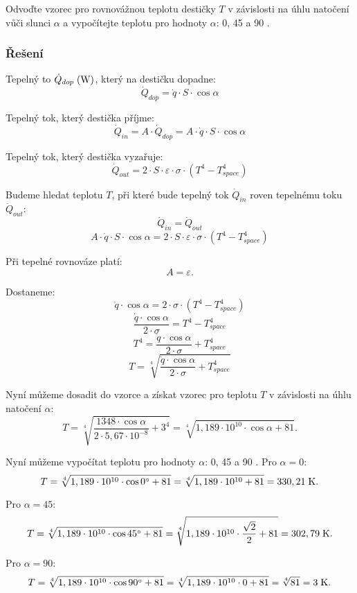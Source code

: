 \documentclass{article}
\begin{document}
Odvoďte vzorec pro rovnovážnou teplotu destičky $T$ v závislosti na úhlu natočení vůči slunci $\alpha$ a vypočítejte teplotu pro hodnoty $\alpha$: 0, 45 a 90 \ueqDEGREE.

\subsubsection{Řešení}
Tepelný to $\dot{Q}_{dop} \; (\textrm{W})$, který na destičku dopadne:
$$
    \dot{Q}_{dop} = \dot{q} \cdot S \cdot \cos \alpha
$$

Tepelný tok, který destička příjme:
$$
    \dot{Q}_{in} = A \cdot \dot{Q}_{dop} = A \cdot \dot{q} \cdot S \cdot \cos \alpha
$$

Tepelný tok, který destička vyzařuje:
$$
    \dot{Q}_{out} = 2 \cdot S \cdot \varepsilon \cdot \sigma \cdot \left( T^4 - T_{space}^4 \right)
$$

Budeme hledat teplotu $T$, při které bude tepelný tok $\dot{Q}_{in}$ roven tepelnému toku $\dot{Q}_{out}$:
$$
    \dot{Q}_{in} = \dot{Q}_{out}
$$
$$
    A \cdot \dot{q} \cdot S \cdot \cos \alpha = 2 \cdot S \cdot \varepsilon \cdot \sigma \cdot \left( T^4 - T_{space}^4 \right)
$$

Při tepelné rovnováze platí:
$$
    A = \varepsilon.
$$

Dostaneme:
$$
    \dot{q} \cdot \cos \alpha = 2 \cdot \sigma \cdot \left( T^4 - T_{space}^4 \right)
$$
$$
    \frac{\dot{q} \cdot \cos \alpha}{2 \cdot \sigma} = T^4 - T_{space}^4
$$
$$
    T^4 = \frac{\dot{q} \cdot \cos \alpha}{2 \cdot \sigma} + T_{space}^4
$$
$$
    T = \sqrt[4]{\frac{\dot{q} \cdot \cos \alpha}{2 \cdot \sigma} + T_{space}^4}
$$

Nyní můžeme dosadit do vzorce a získat vzorec pro teplotu $T$ v závislosti na úhlu natočení $\alpha$:
$$
    T = \sqrt[4]{\frac{1348 \cdot \cos \alpha}{2 \cdot 5,67 \cdot 10^{-8}} + 3^4} = \sqrt[4]{1,189 \cdot 10^{10} \cdot \cos \alpha + 81}.
$$

Nyní můžeme vypočítat teplotu pro hodnoty $\alpha$: 0, 45 a 90 \ueqDEGREE. Pro $\alpha = 0$:
$$
    T = \sqrt[4]{1,189 \cdot 10^{10} \cdot \cos 0 ^\circ + 81} = \sqrt[4]{1,189 \cdot 10^{10} + 81} = 330,21 \; \textrm{K}.
$$

Pro $\alpha = 45$:
$$
    T = \sqrt[4]{1,189 \cdot 10^{10} \cdot \cos 45 ^\circ + 81} = \sqrt[4]{1,189 \cdot 10^{10} \cdot \frac{\sqrt{2}}{2} + 81} = 302,79 \; \textrm{K}.
$$

Pro $\alpha = 90$:
$$
    T = \sqrt[4]{1,189 \cdot 10^{10} \cdot \cos 90 ^\circ + 81} = \sqrt[4]{1,189 \cdot 10^{10} \cdot 0 + 81} = \sqrt[4]{81} = 3 \; \textrm{K}.
$$
\end{document}
